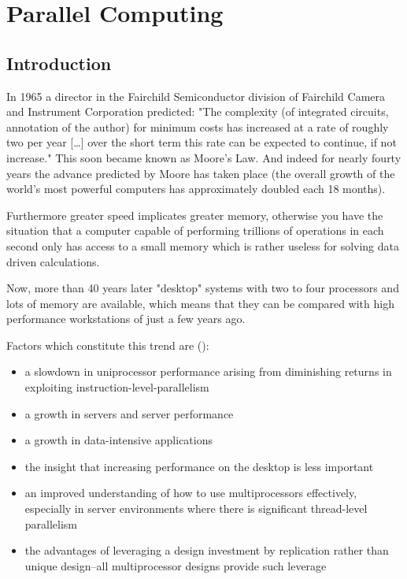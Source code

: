 \chapter{Parallel Computing}
\label{chap:parallelcomputing}
\section{Introduction}

In 1965 a director in the Fairchild Semiconductor division of
Fairchild Camera and Instrument Corporation predicted: "The complexity
(of integrated circuits, annotation of the author)
for minimum costs has increased at a rate of roughly two per year
[\ldots] over the short term this rate can be expected to continue, if
not increase." \cite{moore} This soon became known as Moore's Law. And
indeed for nearly fourty years the advance predicted by Moore has
taken place (the overall growth of the world's most powerful computers
has approximately doubled each 18 months).

Furthermore greater speed implicates greater memory, otherwise you have
the situation that a computer capable of performing trillions of
operations in each second only has access to a small memory which is
rather useless for solving data driven calculations.

Now, more than 40 years later "desktop" systems with two to four
processors and lots of memory are available, which means that they can
be compared with high performance workstations of just a few years
ago.

Factors which constitute this trend are (\cite{architecture}):
\begin{itemize}
\item a slowdown in uniprocessor performance arising from  diminishing
  returns in exploiting instruction-level-parallelism
\item a growth in servers and server performance
\item a growth in data-intensive applications
\item the insight that increasing performance on the desktop is less
  important
\item an improved understanding of how to use multiprocessors
  effectively, especially in server environments where there is
  significant thread-level parallelism
\item the advantages of leveraging a design investment by replication
  rather than unique design--all multiprocessor designs provide such leverage
\end{itemize}

